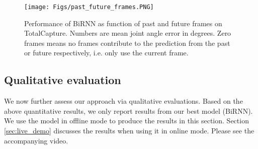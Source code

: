 \documentclass[acmtog]{acmart}
\begin{document}
\begin{figure}
\texttt{[image: Figs/past\_future\_frames.PNG]}
\caption{Performance of BiRNN as function of past and future frames on TotalCapture. Numbers are mean joint angle error in degrees. Zero frames means no frames contribute to the prediction from the past or future respectively, i.e. only use the current frame.}
\label{fig:BiRNN-comparison}
\end{figure}\subsection{Qualitative evaluation}\label{sec:qual_eval}
We now further assess our approach via qualitative evaluations. Based on the above quantitative results, we only report results from our best model (BiRNN). We use the model in offline mode to produce the results in this section. Section \ref{sec:live_demo} discusses the results when using it in online mode. Please see the accompanying video.
\end{document}
